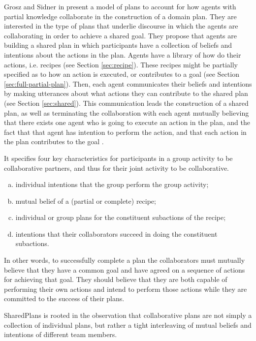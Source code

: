 \documentclass[11pt]{article}
\begin{document}
Grosz and Sidner in \cite{grosz:plans-discourse} present a model of plans to
account for how agents with partial knowledge collaborate in the construction of
a domain plan. They are interested in the type of plans that underlie discourse
in which the agents are collaborating in order to achieve a shared goal. They
propose that agents are building a shared plan in which participants have a
collection of beliefs and intentions about the actions in the plan. Agents have
a library of how do their actions, i.e. recipes (see Section \ref{sec:recipe}).
These recipes might be partially specified as to how an action is executed, or
contributes to a goal (see Section \ref{sec:full-partial-plan}). Then, each
agent communicates their beliefs and intentions by making utterances about what
actions they can contribute to the shared plan (see Section \ref{sec:shared}).
This communication leads the construction of a shared plan, as well as
terminating the collaboration with each agent mutually believing that there
exists one agent who is going to execute an action in the plan, and the fact
that that agent has intention to perform the action, and that each action in the
plan contributes to the goal \cite{grosz:plans-discourse}
\cite{lochbaum:plan-models}.

 It specifies four key characteristics for
participants in a group activity to be collaborative partners, and thus for
their joint activity to be collaborative.

\begin{enumerate}[a)]
  \item individual intentions that the group perform the group activity;
  \item mutual belief of a (partial or complete) recipe;
  \item individual or group plans for the constituent subactions of the recipe;
  \item intentions that their collaborators succeed in doing the constituent
  subactions.
\end{enumerate}

In other words, to successfully complete a plan the collaborators must mutually
believe that they have a common goal and have agreed on a sequence of actions
for achieving that goal. They should believe that they are both capable of
performing their own actions and intend to perform those actions while they are
committed to the success of their plans.

SharedPlans is rooted in the observation that collaborative plans are not simply
a collection of individual plans, but rather a tight interleaving of mutual
beliefs and intentions of different team members.
\end{document}
